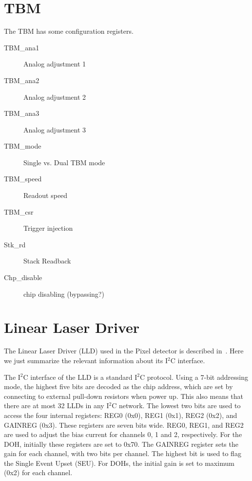 \documentclass{cmspaper}
\begin{document}
\begin{appendix}
\section{TBM \label{app:tbm}}

The TBM has some configuration registers. 

\begin{description}
\item[TBM\_ana1] Analog adjustment 1
\item[TBM\_ana2] Analog adjustment 2
\item[TBM\_ana3] Analog adjustment 3
\item[TBM\_mode] Single vs. Dual TBM mode
\item[TBM\_speed] Readout speed
\item[TBM\_csr]Trigger injection
\item[Stk\_rd] Stack Readback
\item[Chp\_disable] chip disabling (bypassing?)
\end{description}

\section{Linear Laser Driver \label{app:lld}}

The Linear Laser Driver (LLD) used in the Pixel detector is 
described in~\cite{LLD}. Here we just summarize the relevant 
information about its I$^2$C interface.

The I$^2$C interface of the LLD is a standard I$^2$C protocol. 
Using a 7-bit addressing mode, the 
highest five bits are decoded as the chip address, which are set 
by connecting to external pull-down resistors when power up. 
This also means that there are at most 32 LLDs in any I$^2$C network.  
The lowest two bits are used to access the four internal registers:
REG0 (0x0), REG1 (0x1), REG2 (0x2), and GAINREG (0x3). These registers 
are seven bits wide. REG0, REG1, and REG2 are used to adjust the 
bias current for channels 0, 1 and 2, respectively. 
For the DOH, initially these 
registers are set to 0x70. The GAINREG register sets the gain for 
each channel, with two bits per channel. 
The highest bit is used to flag 
the Single Event Upset (SEU). For DOHs, the initial gain is set to 
maximum (0x2) for each channel. 


\end{appendix}
\end{document}

